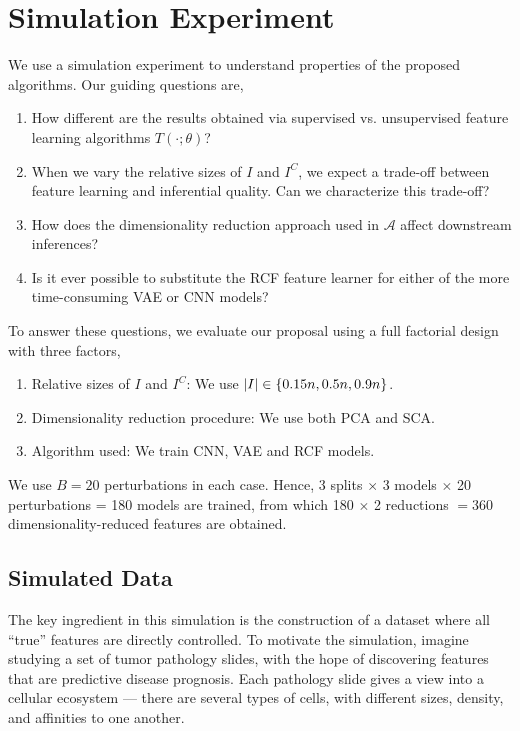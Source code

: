 
\section{Simulation Experiment}
\label{sec:simulation}

We use a simulation experiment to understand properties of the proposed
algorithms. Our guiding questions are,

\begin{enumerate}[label=(G{{\arabic*}})]
\item How different are the results obtained via supervised vs. unsupervised
  feature learning algorithms $T\left(\cdot; \theta\right)$?
\item When we vary the relative sizes of $I$ and $I^{C}$, we expect a trade-off
  between feature learning and inferential quality. Can we characterize this
  trade-off?
\item How does the dimensionality reduction approach used in $\mathcal{A}$
  affect downstream inferences?
\item Is it ever possible to substitute the RCF feature learner for either of
  the more time-consuming VAE or CNN models?
\end{enumerate}

To answer these questions, we evaluate our proposal using a full factorial
design with three factors,

\begin{enumerate}
\item Relative sizes of $I$ and $I^{C}$: We use $\left|I\right| \in \left\{0.15n,
  0.5n, 0.9n\right\}$.
\item Dimensionality reduction procedure: We use both PCA and SCA.
\item Algorithm used: We train CNN, VAE and RCF models.
\end{enumerate}

We use $B = 20$ perturbations in each case. Hence, 3 splits $\times$ 3 models
$\times$ 20 perturbations = 180 models are trained, from which 180 $\times$ 2
reductions $= 360$ dimensionality-reduced features are obtained.

\subsection{Simulated Data}

The key ingredient in this simulation is the construction of a dataset where all
``true'' features are directly controlled. To motivate the simulation, imagine
studying a set of tumor pathology slides, with the hope of discovering features
that are predictive disease prognosis. Each pathology slide gives a view into a
cellular ecosystem — there are several types of cells, with different sizes,
density, and affinities to one another.

